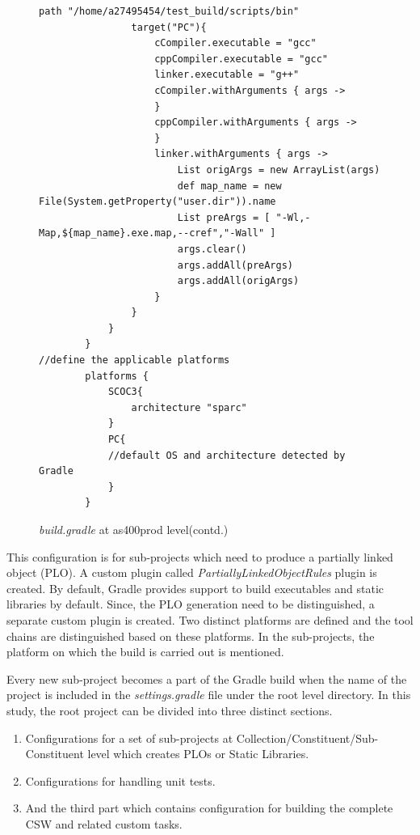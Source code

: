 \documentclass[12pt, a4paper, titlepage]{scrartcl}
\newcommand{\courierword}[1]{\textsf{\itshape #1}}{\fontfamily{pcr}\selectfont}%
\begin{document}
\begin{figure}[!ht]
\begin{lstlisting}[frame=single,firstnumber=33]
				path "/home/a27495454/test_build/scripts/bin"
				target("PC"){
					cCompiler.executable = "gcc"
					cppCompiler.executable = "gcc"
					linker.executable = "g++"
					cCompiler.withArguments { args ->
					}
					cppCompiler.withArguments { args ->
					}
					linker.withArguments { args ->
						List origArgs = new ArrayList(args)
						def map_name = new File(System.getProperty("user.dir")).name
						List preArgs = [ "-Wl,-Map,${map_name}.exe.map,--cref","-Wall" ]
						args.clear()
						args.addAll(preArgs)
						args.addAll(origArgs)						
					}
				}				
			}
		}
//define the applicable platforms		
		platforms {
			SCOC3{
				architecture "sparc"
			}
			PC{
			//default OS and architecture detected by Gradle 
			}
		}
\end{lstlisting}
\caption{\courierword{build.gradle} at as400prod level(contd.)}
\label{fig:root-project-build-logic-part-2}
\end{figure}
\par This configuration is for sub-projects which need to produce a partially linked object (PLO). A custom plugin called \emph{PartiallyLinkedObjectRules} plugin is created. By default, Gradle provides support to build executables and static libraries by default. Since, the PLO generation need to be distinguished, a separate custom plugin is created. Two distinct platforms are defined and the tool chains are distinguished based on these platforms. In the sub-projects, the platform on which the build is carried out is mentioned.
\par Every new sub-project becomes a part of the Gradle build when the name of the project is included in the \emph{settings.gradle} file under the root level directory. In this study, the root project can be divided into three distinct sections. 
\begin{enumerate}
\item Configurations for a set of sub-projects at Collection/Constituent/Sub-Constituent level which creates PLOs or Static Libraries. \item Configurations for handling unit tests. 
\item And the third part which contains configuration for building the complete CSW and related custom tasks. 
\end{enumerate}
\end{document}
